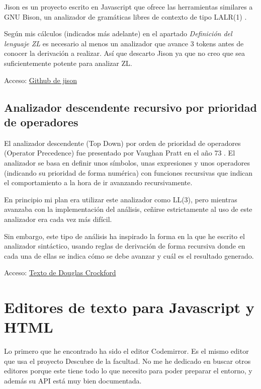 \documentclass{report}
\begin{document}
	Jison es un proyecto escrito en Javascript que ofrece las herramientas similares a GNU Bison, un analizador de gramáticas libres de contexto de tipo LALR(1) \cite{bison}.
	
	Según mis cálculos (indicados más adelante) en el apartado \textit{Definición del lenguaje ZL} es necesario al menos un analizador que avance 3 tokens antes de conocer la derivación a realizar. Así que descarto Jison ya que no creo que sea suficientemente potente para analizar ZL. 
	
	Acceso:
	\href{https://github.com/zaach/jison}{Github de jison}	
	
	\subsection{Analizador descendente recursivo por prioridad de operadores}
	
	El analizador descendente (Top Down) por orden de prioridad de operadores (Operator Precedence) fue presentado por Vaughan Pratt en el año 73 \cite{acmtdop}. El analizador se basa en definir unos símbolos, unas expresiones y unos operadores (indicando su prioridad de forma numérica) con funciones recursivas que indican el comportamiento a la hora de ir avanzando recursivamente.
	
	
	En principio mi plan era utilizar este analizador como LL(3), pero mientras avanzaba con la implementación del análisis, ceñirse estrictamente al uso de este analizador era cada vez más difícil. 
	
	Sin embargo, este tipo de análisis ha inspirado la forma en la que he escrito el analizador sintáctico, usando reglas de derivación de forma recursiva donde en cada una de ellas se indica
	cómo se debe avanzar y cuál es el resultado generado. 
	
	Acceso:
	\href{http://javascript.crockford.com/tdop/tdop.html}{Texto de Douglas Crockford}
	
	\section{Editores de texto para Javascript y HTML}
	
	Lo primero que he encontrado ha sido el editor Codemirror. Es el mismo editor que usa el proyecto Descubre de la facultad. No me he dedicado en buscar otros editores porque este tiene
	todo lo que necesito para poder preparar el entorno, y además su API está muy bien documentada\cite{codemirrorapi}.
	
\end{document}
